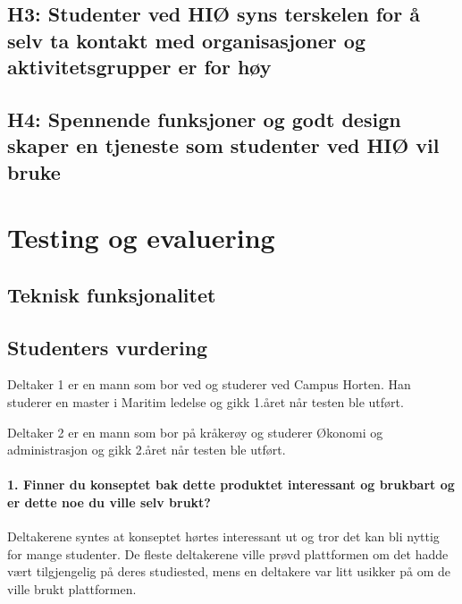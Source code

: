 \subsection{H3: Studenter ved HIØ syns terskelen for å selv ta kontakt med organisasjoner og aktivitetsgrupper er for høy}

\subsection{H4: Spennende funksjoner og godt design skaper en tjeneste som studenter ved HIØ vil bruke}


\section{Testing og evaluering}

\subsection{Teknisk funksjonalitet}

\subsection{Studenters vurdering}
Deltaker 1 er en mann som bor ved og studerer ved Campus Horten. Han studerer en master i Maritim ledelse og gikk 1.året når testen ble utført.

Deltaker 2 er en mann som bor på kråkerøy og studerer Økonomi og administrasjon og gikk 2.året når testen ble utført. %
\paragraph{1. Finner du konseptet bak dette produktet interessant og brukbart og er dette noe du ville selv brukt?}
Deltakerene syntes at konseptet hørtes interessant ut og tror det kan bli nyttig for mange studenter. De fleste deltakerene ville prøvd plattformen om det hadde vært tilgjengelig på deres studiested, mens en deltakere var litt usikker på om de ville brukt plattformen.

